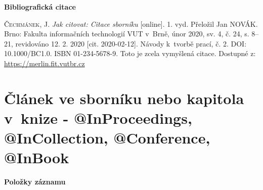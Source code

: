 \bigskip

\noindent \textbf{Bibliografická citace}

\medskip

\noindent \textsc{Čechmánek}, J. \textit{Jak citovat: Citace sborníku} [online]. 1. vyd. Přeložil Jan NOVÁK.
Brno: Fakulta informačních technologií VUT v~Brně, únor 2020, sv. 4, č. 24, s. 8–21, revidováno 12. 2. 2020 [cit. 2020-02-12]. Návody k~tvorbě prací, č. 2. DOI: 10.1000/BC1.0. ISBN 01-234-5678-9. Toto je zcela vymyšlená citace. Dostupné z: \url{https://merlin.fit.vutbr.cz}
\newpage
\section*{Článek ve sborníku nebo kapitola v~knize - @InProceedings, @InCollection, @Conference, @InBook}
\label{pr-kapitola}
\noindent \textbf{Položky záznamu}

\medskip

